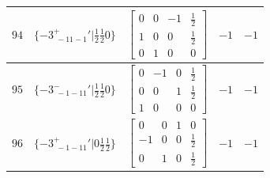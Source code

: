 \documentclass[fleqn,8pt]{jsarticle}
\begin{document}
\begin{longtable}{ccccc}
$ 94 $ & $ \{-3^{+}_{\,\,-11-1}{}'|\frac{1}{2} \frac{1}{2} 0\} $ & $ \begin{bmatrix} 0 & 0 & -1 & \frac{1}{2} \\ 1 & 0 & 0 & \frac{1}{2} \\ 0 & 1 & 0 & 0 \end{bmatrix} $ & $ -1 $ & $ -1 $ \\ \hline
$ 95 $ & $ \{-3^{-}_{\,\,-1-11}{}'|\frac{1}{2} \frac{1}{2} 0\} $ & $ \begin{bmatrix} 0 & -1 & 0 & \frac{1}{2} \\ 0 & 0 & 1 & \frac{1}{2} \\ 1 & 0 & 0 & 0 \end{bmatrix} $ & $ -1 $ & $ -1 $ \\ \hline
$ 96 $ & $ \{-3^{+}_{\,\,-1-11}{}'|0 \frac{1}{2} \frac{1}{2}\} $ & $ \begin{bmatrix} 0 & 0 & 1 & 0 \\ -1 & 0 & 0 & \frac{1}{2} \\ 0 & 1 & 0 & \frac{1}{2} \end{bmatrix} $ & $ -1 $ & $ -1 $ \\
\end{longtable}
\end{document}
